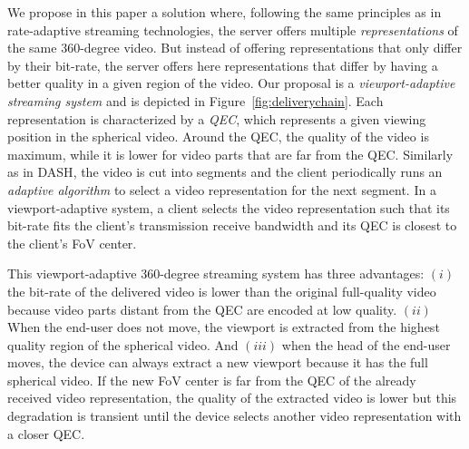 We propose in this paper a solution where, following the same
principles as in rate-adaptive streaming technologies, the server
offers multiple \emph{representations} of the same 360-degree video.
But instead of offering representations that only differ by their
bit-rate, the server offers here representations that differ by having
a better quality in a given region of the video. Our proposal is a
\emph{viewport-adaptive streaming system} and is depicted in
Figure~\ref{fig:deliverychain}. Each representation is characterized
by a \emph{\ac{QEC}}, which represents a given viewing position in the
spherical video. Around the \ac{QEC}, the quality of the video is
maximum, while it is lower for video parts that are far from the
\ac{QEC}. Similarly as in \ac{DASH}, the video is cut into segments
and the client periodically runs an \emph{adaptive algorithm} to
select a video representation for the next segment. In a
viewport-adaptive system, a client selects the video representation
such that its bit-rate fits the client's transmission receive
bandwidth and its \ac{QEC} is closest to the client's \ac{FoV} center.



This viewport-adaptive 360-degree streaming system has three
advantages: $(i)$ the bit-rate of the delivered video is lower than
the original full-quality video because video parts distant from the
\ac{QEC} are encoded at low quality. $(ii)$ When the end-user does not
move, the viewport is extracted from the highest quality region of the
spherical video. And $(iii)$ when the head of the end-user moves, the
device can always extract a new viewport because it has the full
spherical video. If the new \ac{FoV} center is far from the \ac{QEC}
of the already received video representation, the quality of the
extracted video is lower but this degradation is transient until the
device selects another video representation with a closer \ac{QEC}.

